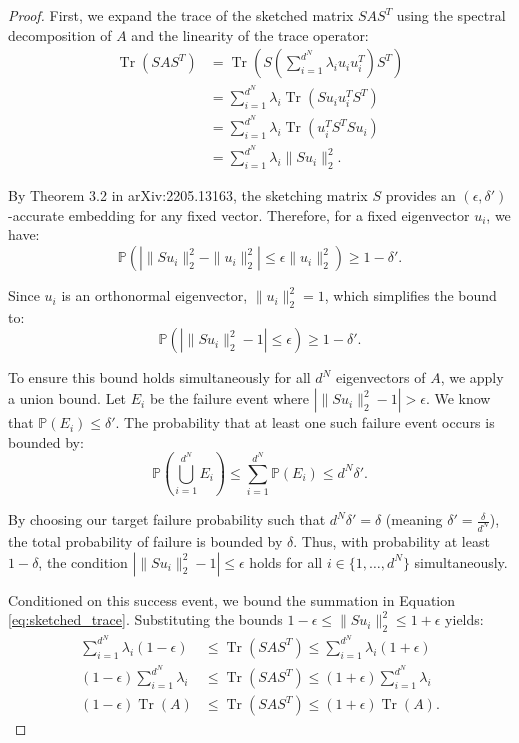 \documentclass{article}
\theoremstyle{remark}
\begin{document}
\begin{proof}
First, we expand the trace of the sketched matrix $S A S^T$ using the spectral decomposition of $A$ and the linearity of the trace operator:
\begin{align}
    \operatorname{Tr}(S A S^T) &= \operatorname{Tr}\left( S \left( \sum_{i=1}^{d^N} \lambda_i u_i u_i^T \right) S^T \right) \\
    &= \sum_{i=1}^{d^N} \lambda_i \operatorname{Tr}\left( S u_i u_i^T S^T \right) \\
    &= \sum_{i=1}^{d^N} \lambda_i \operatorname{Tr}\left( u_i^T S^T S u_i \right) \\
    &= \sum_{i=1}^{d^N} \lambda_i \| S u_i \|_2^2. \label{eq:sketched_trace}
\end{align}

By Theorem 3.2 in arXiv:2205.13163, the sketching matrix $S$ provides an $(\epsilon, \delta')$-accurate embedding for any fixed vector. Therefore, for a fixed eigenvector $u_i$, we have:
\begin{equation}
    \mathbb{P}\left( \left| \| S u_i \|_2^2 - \| u_i \|_2^2 \right| \le \epsilon \| u_i \|_2^2 \right) \ge 1 - \delta'.
\end{equation}

Since $u_i$ is an orthonormal eigenvector, $\| u_i \|_2^2 = 1$, which simplifies the bound to:
\begin{equation}
    \mathbb{P}\left( \left| \| S u_i \|_2^2 - 1 \right| \le \epsilon \right) \ge 1 - \delta'.
\end{equation}

To ensure this bound holds simultaneously for all $d^N$ eigenvectors of $A$, we apply a union bound. Let $E_i$ be the failure event where $\left| \| S u_i \|_2^2 - 1 \right| > \epsilon$. We know that $\mathbb{P}(E_i) \le \delta'$. The probability that at least one such failure event occurs is bounded by:
\begin{equation}
    \mathbb{P}\left( \bigcup_{i=1}^{d^N} E_i \right) \le \sum_{i=1}^{d^N} \mathbb{P}(E_i) \le d^N \delta'.
\end{equation}

By choosing our target failure probability such that $d^N \delta' = \delta$ (meaning $\delta' = \frac{\delta}{d^N}$), the total probability of failure is bounded by $\delta$. Thus, with probability at least $1 - \delta$, the condition $\left| \| S u_i \|_2^2 - 1 \right| \le \epsilon$ holds for all $i \in \{1, \dots, d^N\}$ simultaneously.

Conditioned on this success event, we bound the summation in Equation \ref{eq:sketched_trace}. Substituting the bounds $1 - \epsilon \le \| S u_i \|_2^2 \le 1 + \epsilon$ yields:
\begin{align}
    \sum_{i=1}^{d^N} \lambda_i (1 - \epsilon) &\le \operatorname{Tr}(S A S^T) \le \sum_{i=1}^{d^N} \lambda_i (1 + \epsilon) \\
    (1 - \epsilon) \sum_{i=1}^{d^N} \lambda_i &\le \operatorname{Tr}(S A S^T) \le (1 + \epsilon) \sum_{i=1}^{d^N} \lambda_i \\
    (1 - \epsilon) \operatorname{Tr}(A) &\le \operatorname{Tr}(S A S^T) \le (1 + \epsilon) \operatorname{Tr}(A).
\end{align}


\end{proof}
\end{document}
